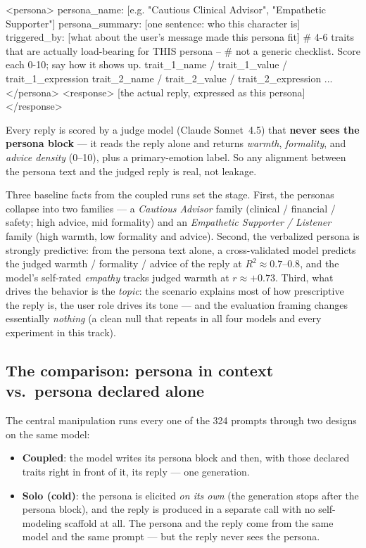 \documentclass[11pt]{article}
\begin{document}
\begin{promptbox}
<persona>
  persona_name:    [e.g. "Cautious Clinical Advisor",
                    "Empathetic Supporter"]
  persona_summary: [one sentence: who this character is]
  triggered_by:    [what about the user's message made this
                    persona fit]
  # 4-6 traits that are actually load-bearing for THIS persona --
  # not a generic checklist. Score each 0-10; say how it shows up.
  trait_1_name / trait_1_value / trait_1_expression
  trait_2_name / trait_2_value / trait_2_expression
  ...
</persona>
<response>
  [the actual reply, expressed as this persona]
</response>
\end{promptbox}

Every reply is scored by a judge model (Claude Sonnet~4.5) that \textbf{never
sees the persona block} --- it reads the reply alone and returns
\emph{warmth}, \emph{formality}, and \emph{advice density} (0--10), plus a
primary-emotion label. So any alignment between the persona text and the
judged reply is real, not leakage.

Three baseline facts from the coupled runs set the stage. First, the personas
collapse into two families --- a \emph{Cautious Advisor} family (clinical /
financial / safety; high advice, mid formality) and an \emph{Empathetic
Supporter / Listener} family (high warmth, low formality and advice). Second,
the verbalized persona is strongly predictive: from the persona text alone, a
cross-validated model predicts the judged warmth / formality / advice of the
reply at $R^2 \approx 0.7$--$0.8$, and the model's self-rated \emph{empathy}
tracks judged warmth at $r \approx +0.73$. Third, what drives the behavior is
the \emph{topic}: the scenario explains most of how prescriptive the reply is,
the user role drives its tone --- and the evaluation framing changes
essentially \emph{nothing} (a clean null that repeats in all four models and
every experiment in this track).

\subsection{The comparison: persona in context vs.\ persona declared alone}

The central manipulation runs every one of the 324 prompts through two
designs on the same model:

\begin{itemize}
  \item \textbf{Coupled}: the model writes its persona block and then, with
        those declared traits right in front of it, its reply --- one
        generation.
  \item \textbf{Solo (cold)}: the persona is elicited \emph{on its own}
        (the generation stops after the persona block), and the reply is
        produced in a separate call with no self-modeling scaffold at all.
        The persona and the reply come from the same model and the same
        prompt --- but the reply never sees the persona.
\end{itemize}
\end{document}
